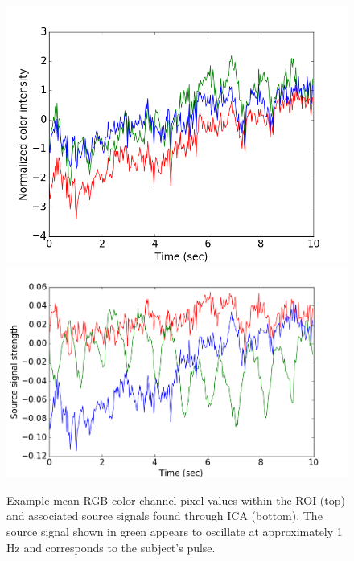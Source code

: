 \documentclass[10pt,twocolumn,letterpaper]{article}
\begin{document}
\begin{figure}
\begin{center}
	\includegraphics[scale=0.46]{figures/RGB_signals_10sec.png}
	\includegraphics[scale=0.38]{figures/src_signals_10sec.png}
\end{center}
\caption{Example mean RGB color channel pixel values within the ROI (top) and associated source signals found through ICA (bottom). The source signal shown in green appears to oscillate at approximately 1 Hz and corresponds to the subject's pulse. }
\label{time_plots}
\end{figure}
\end{document}

